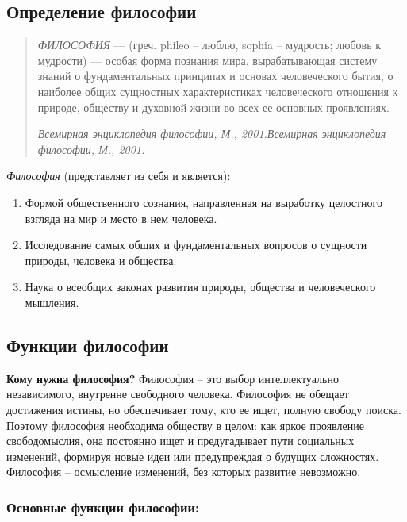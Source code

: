 \documentclass[a4paper, 14pt]{extreport}
\begin{document}
\subsection{Определение философии}

\begin{quote}
\emph{ФИЛОСОФИЯ} ---
(греч. phileo -- люблю, sophia -- мудрость; любовь к мудрости) ---
особая форма познания мира, вырабатывающая систему знаний о
фундаментальных принципах и основах человеческого бытия, о наиболее
общих сущностных характеристиках человеческого отношения к природе,
обществу и духовной жизни во всех ее основных проявлениях.


\emph{Всемирная энциклопедия философии, М., 2001.Всемирная энциклопедия
философии, М., 2001.}
\end{quote}

\emph{Философия} (представляет из себя и является):

\begin{enumerate}
\def\labelenumi{\arabic{enumi}.}

\item
  Формой общественного сознания, направленная на выработку целостного
  взгляда на мир и место в нем человека.
\item
  Исследование самых общих и фундаментальных вопросов о сущности
  природы, человека и общества.
\item
  Наука о всеобщих законах развития природы, общества и человеческого
  мышления.
\end{enumerate}

\subsection{Функции философии}

\textbf{Кому нужна философия?} Философия -- это выбор интеллектуально
независимого, внутренне свободного человека. Философия не обещает
достижения истины, но обеспечивает тому, кто ее ищет, полную свободу
поиска. Поэтому философия необходима обществу в целом: как яркое
проявление свободомыслия, она постоянно ищет и предугадывает пути
социальных изменений, формируя новые идеи или предупреждая о будущих
сложностях. Философия -- осмысление изменений, без которых развитие
невозможно.

\subsubsection{Основные функции философии:}
\end{document}
